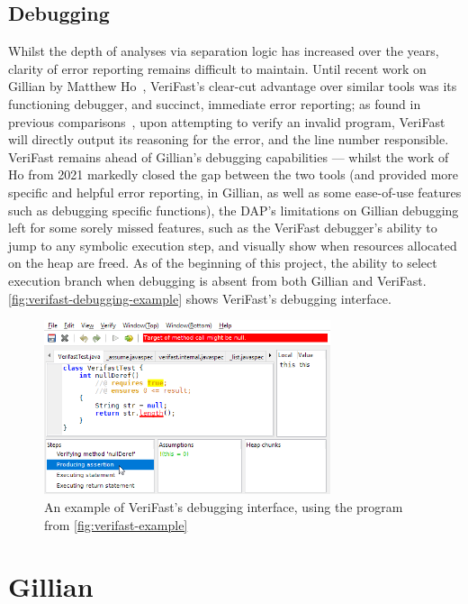 \subsection{Debugging}

Whilst the depth of analyses via separation logic has increased over the years,
clarity of error reporting remains difficult to maintain. Until recent work on
Gillian by Matthew Ho~\cite{gillian-debugging-2021}, VeriFast's clear-cut
advantage over similar tools was its functioning debugger, and succinct,
immediate error reporting; as found in previous
comparisons~\cite{gillian-logging-2020}, upon attempting to verify an invalid
program, VeriFast will directly output its reasoning for the error, and the line
number responsible. VeriFast remains ahead of Gillian's debugging capabilities
--- whilst the work of Ho from 2021 markedly closed the gap between the two
tools (and provided more specific and helpful error reporting, in Gillian, as
well as some ease-of-use features such as debugging specific functions),
the DAP's limitations on Gillian debugging left for some sorely missed features,
such as the VeriFast debugger's ability to jump to any symbolic execution step,
and visually show when resources allocated on the heap are freed. As of the
beginning of this project, the ability to select execution branch when debugging
is absent from both Gillian and VeriFast.
\autoref{fig:verifast-debugging-example} shows VeriFast's debugging interface.

\begin{figure}
  \centering
  \includegraphics[width=0.75\textwidth]{img/verifast-debugging-example.png}
  \caption{
    An example of VeriFast's debugging interface, using the program from
    \autoref{fig:verifast-example}
  }\label{fig:verifast-debugging-example}
\end{figure}

\section{Gillian}\label{sec:background:gillian}

